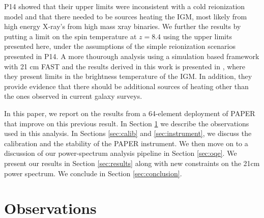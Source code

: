 \documentclass[twocolumn,numberedappendix]{emulateapj} \shorttitle{PSA64}
\begin{document}
P14 showed that their upper limits were inconsistent with a cold reionization
model and that there needed to be sources  heating the IGM, most likely from
high energy X-ray's from high mass xray binaries. 
We further the results by
putting a limit on the spin temperature at $z=8.4$ using the upper limits presented here,
under the assumptions of the simple reionization scenarios presented in P14. 
A more thourough analysis using a simulation based framework with 21 cm FAST and the
results derived in this work is presented in \citep{pober_et_al2015}, where they present limits in the brightness temperature of the IGM. In addition, they provide evidence that there should be additional sources of heating other than the ones observed in current galaxy surveys.

In this paper, we report on the results from a 64-element deployment of PAPER
that improve on this previous result.  In Section
\ref{sec:observations} we describe the observations used in this analysis. In
Sections \ref{sec:calib} and \ref{sec:instrument}, 
we discuss the calibration and 
the stability of the PAPER instrument.
We then move on to a discussion of our power-spectrum analysis pipeline in Section
\ref{sec:oqe}. 
We present our results in Section
\ref{sec:results} along with new constraints on the 21cm power spectrum.
We conclude in Section \ref{sec:conclusion}.



\section{Observations}\label{sec:observations}
\end{document}
